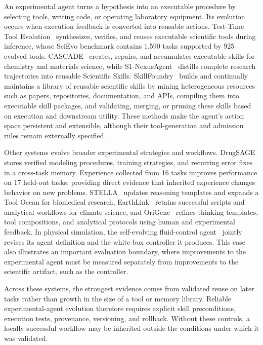 An experimental agent turns a hypothesis into an executable procedure by selecting tools, writing code, or operating laboratory equipment. Its evolution occurs when execution feedback is converted into reusable actions. Test-Time Tool Evolution~\cite{lu2026tool} synthesizes, verifies, and reuses executable scientific tools during inference, whose SciEvo benchmark contains 1,590 tasks supported by 925 evolved tools. 
CASCADE~\cite{huang2025cascade} creates, repairs, and accumulates executable skills for chemistry and materials science, while S1-NexusAgent~\cite{s1nexusagent2026framework} distills complete research trajectories into reusable Scientific Skills. 
SkillFoundry~\cite{shen2026skillfoundry} builds and continually maintains a library of reusable scientific skills by mining heterogeneous resources such as papers, repositories, documentation, and APIs, compiling them into executable skill packages, and validating, merging, or pruning these skills based on execution and downstream utility.
These methods make the agent's action space persistent and extensible, although their tool-generation and admission rules remain externally specified.

Other systems evolve broader experimental strategies and workflows. 
DrugSAGE~\cite{zhang2026drugsage} stores verified modeling procedures, training strategies, and recurring error fixes in a cross-task memory. Experience collected from 16 tasks improves performance on 17 held-out tasks, providing direct evidence that inherited experience changes behavior on new problems. 
STELLA~\cite{jin2025stella} updates reasoning templates and expands a Tool Ocean for biomedical research, EarthLink~\cite{guo2025earthlink} retains successful scripts and analytical workflows for climate science, and OriGene~\cite{zhang2025origene} refines thinking templates, tool compositions, and analytical protocols using human and experimental feedback. 
In physical simulation, the self-evolving fluid-control agent~\cite{sun2026fluidcontrol} jointly revises its agent definition and the white-box controller it produces. This case also illustrates an important evaluation boundary, where improvements to the experimental agent must be measured separately from improvements to the scientific artifact, such as the controller.

Across these systems, the strongest evidence comes from validated reuse on later tasks rather than growth in the size of a tool or memory library. Reliable experimental-agent evolution therefore requires explicit skill preconditions, execution tests, provenance, versioning, and rollback. Without these controls, a locally successful workflow may be inherited outside the conditions under which it was validated.

